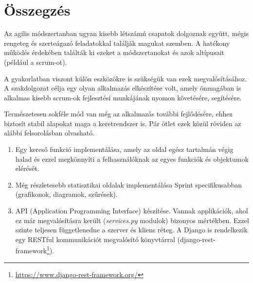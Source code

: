 \chapter{Összegzés} %
\label{ch:sum}

Az agilis módszertanban ugyan kisebb létszámú csapatok dolgoznak együtt, mégis rengeteg és szerteágazó feladatokkal találják magukat szemben. A hatékony működés érdekében találták ki ezeket a módszertanokat és azok altípusait (például a scrum-ot). 

A gyakorlatban viszont külön eszközökre is szükségük van ezek megvalósításához. A szakdolgozat célja egy olyan alkalmazás elkészítése volt, amely önmagában is alkalmas kisebb scrum-ok fejlesztési munkájának nyomon követésére, segítésére. 

Természetesen sokféle mód van még az alkalmazás további fejlődésére, ehhez biztosít stabil alapokat maga a keretrendszer is. Pár ötlet ezek közül röviden az alábbi felsorolásban olvasható.

\begin{enumerate}
    \item Egy kereső funkció implementálása, amely az oldal egész tartalmán végig halad és ezzel megkönnyíti a felhasználóknak az egyes funkciók és objektumok elérését.
    \item Még részletesebb statisztikai oldalak implementálása Sprint specifikusabban (grafikonok, diagramok, szűrések).
    \item API (Application Programming Interface) készítése. Vannak applikációk, ahol ez már megvalósításra került (\textit{services.py} modulok) bizonyos mértékben. Ezzel szinte teljesen függetlenedne a szerver és kliens réteg.
    A Django is rendelkezik egy RESTful kommunikációt megvalósító könyvtárral (django-rest-framework\footnote{\url{https://www.django-rest-framework.org/}}).
\end{enumerate}




